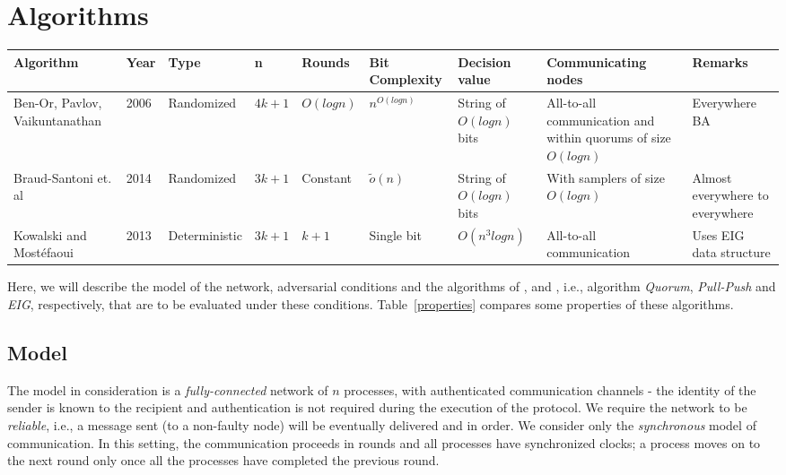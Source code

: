﻿\section{Algorithms}
\label{sec:algos}

\begin{table*}[t]
    \label{properties}
    \begin{tabular}{p{2cm}llllllp{2.5cm}p{2cm}}
\hline
\textbf{Algorithm} & \textbf{Year} & \textbf{Type} &\textbf{n} & \textbf{Rounds} & \textbf{Bit Complexity } &\textbf{Decision value} & \textbf{Communicating nodes}& \textbf{Remarks} \\ \hline
Ben-Or, Pavlov, Vaikuntanathan \cite{BPV06} & 2006 & Randomized & $4k + 1$ & $O(logn)$ & $n^{O(logn)}$      &String of $O(logn)$ bits &All-to-all communication and within quorums of size $O(logn)$   & Everywhere BA     \\
          Braud-Santoni et. al \cite{BGH13} & 2014 & Randomized & $3k + 1$ & Constant & $\tilde{o}(n)$      &String of $O(logn)$ bits &With samplers of size $O(logn)$  & Almost everywhere to everywhere     \\
 Kowalski and Most{\'{e}}faoui \cite{MHR14} & 2013   & Deterministic & $3k + 1$     & $k + 1$               &Single bit               & $O(n^3logn)$ &All-to-all communication & Uses EIG data structure\\ \hline
%
\end{tabular}
\end{table*}



Here, we will describe the model of the network, adversarial conditions and the algorithms of \cite{BPV06}, \cite{BGH13} and \cite{MHR14}, i.e., algorithm \textit{Quorum}, \textit{Pull-Push} and \textit{EIG}, respectively, that are to be evaluated under these conditions. Table~\ref{properties} compares some properties of these algorithms.


\subsection{Model}
The model in consideration is a \textit{fully-connected} network of $n$ processes, with authenticated communication channels - the identity of the sender is known to the recipient and authentication is not required during the execution of the protocol. We require the network to be \textit{reliable}, i.e., a message sent (to a non-faulty node) will be eventually delivered and in order. We consider only the \textit{synchronous} model of communication. In this setting, the communication proceeds in rounds and all processes have synchronized clocks; a process moves on to the next round only once all the processes have completed the previous round. %

